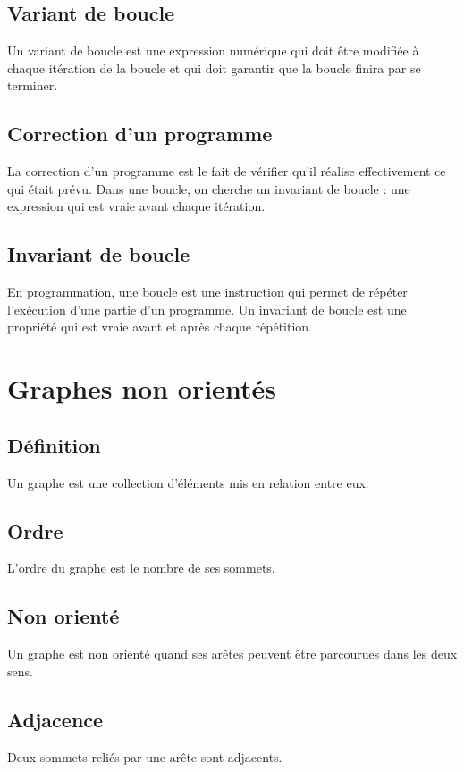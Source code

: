 \documentclass{article}
\begin{document}
\subsection{Variant de boucle}
Un variant de boucle est une expression numérique qui doit être modifiée à chaque itération de la boucle et qui doit garantir que la boucle finira par se terminer.

\subsection{Correction d'un programme}
La correction d’un programme est le fait de vérifier qu’il réalise effectivement ce qui était prévu.  
Dans une boucle, on cherche un invariant de boucle : une expression qui est vraie avant chaque itération.

\subsection{Invariant de boucle}
En programmation, une boucle est une instruction qui permet de répéter l'exécution d'une partie d'un programme. Un invariant de boucle est une propriété qui est vraie avant et après chaque répétition.

\section{Graphes non orientés}

\subsection{Définition}
Un graphe est une collection d’éléments mis en relation entre eux.

\subsection{Ordre}
L’ordre du graphe est le nombre de ses sommets.

\subsection{Non orienté}
Un graphe est non orienté quand ses arêtes peuvent être parcourues dans les deux sens.

\subsection{Adjacence}
Deux sommets reliés par une arête sont adjacents.
\end{document}

